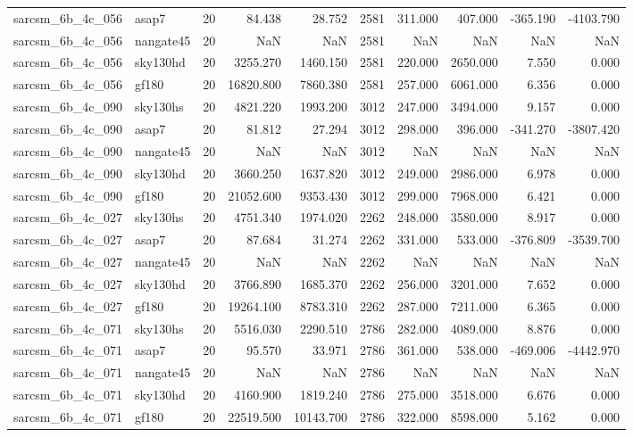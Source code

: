 \documentclass{article}
\begin{document}
\begin{longtable}{llrrrrrrrr}
sarcsm\_6b\_4c\_056 & asap7 & 20 & 84.438 & 28.752 & 2581 & 311.000 & 407.000 & -365.190 & -4103.790 \\
sarcsm\_6b\_4c\_056 & nangate45 & 20 & NaN & NaN & 2581 & NaN & NaN & NaN & NaN \\
sarcsm\_6b\_4c\_056 & sky130hd & 20 & 3255.270 & 1460.150 & 2581 & 220.000 & 2650.000 & 7.550 & 0.000 \\
sarcsm\_6b\_4c\_056 & gf180 & 20 & 16820.800 & 7860.380 & 2581 & 257.000 & 6061.000 & 6.356 & 0.000 \\
sarcsm\_6b\_4c\_090 & sky130hs & 20 & 4821.220 & 1993.200 & 3012 & 247.000 & 3494.000 & 9.157 & 0.000 \\
sarcsm\_6b\_4c\_090 & asap7 & 20 & 81.812 & 27.294 & 3012 & 298.000 & 396.000 & -341.270 & -3807.420 \\
sarcsm\_6b\_4c\_090 & nangate45 & 20 & NaN & NaN & 3012 & NaN & NaN & NaN & NaN \\
sarcsm\_6b\_4c\_090 & sky130hd & 20 & 3660.250 & 1637.820 & 3012 & 249.000 & 2986.000 & 6.978 & 0.000 \\
sarcsm\_6b\_4c\_090 & gf180 & 20 & 21052.600 & 9353.430 & 3012 & 299.000 & 7968.000 & 6.421 & 0.000 \\
sarcsm\_6b\_4c\_027 & sky130hs & 20 & 4751.340 & 1974.020 & 2262 & 248.000 & 3580.000 & 8.917 & 0.000 \\
sarcsm\_6b\_4c\_027 & asap7 & 20 & 87.684 & 31.274 & 2262 & 331.000 & 533.000 & -376.809 & -3539.700 \\
sarcsm\_6b\_4c\_027 & nangate45 & 20 & NaN & NaN & 2262 & NaN & NaN & NaN & NaN \\
sarcsm\_6b\_4c\_027 & sky130hd & 20 & 3766.890 & 1685.370 & 2262 & 256.000 & 3201.000 & 7.652 & 0.000 \\
sarcsm\_6b\_4c\_027 & gf180 & 20 & 19264.100 & 8783.310 & 2262 & 287.000 & 7211.000 & 6.365 & 0.000 \\
sarcsm\_6b\_4c\_071 & sky130hs & 20 & 5516.030 & 2290.510 & 2786 & 282.000 & 4089.000 & 8.876 & 0.000 \\
sarcsm\_6b\_4c\_071 & asap7 & 20 & 95.570 & 33.971 & 2786 & 361.000 & 538.000 & -469.006 & -4442.970 \\
sarcsm\_6b\_4c\_071 & nangate45 & 20 & NaN & NaN & 2786 & NaN & NaN & NaN & NaN \\
sarcsm\_6b\_4c\_071 & sky130hd & 20 & 4160.900 & 1819.240 & 2786 & 275.000 & 3518.000 & 6.676 & 0.000 \\
sarcsm\_6b\_4c\_071 & gf180 & 20 & 22519.500 & 10143.700 & 2786 & 322.000 & 8598.000 & 5.162 & 0.000 \\

\end{longtable}
\end{document}
